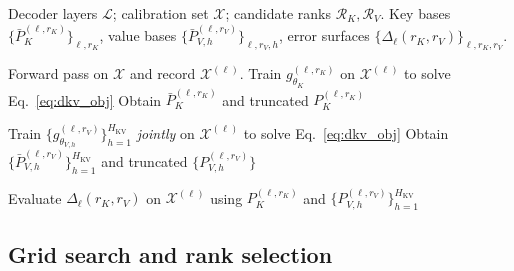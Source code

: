 \begin{algorithm}[t]
\caption{\methodname basis training and error-surface construction}
\label{alg:stiefattention}
\begin{algorithmic}[1]
{\renewcommand{\algorithmicrequire}{\textbf{Input:}}%
\REQUIRE Decoder layers $\mathcal{L}$; calibration set $\mathcal{X}$; candidate ranks $\mathcal{R}_K,\mathcal{R}_V$.}
{\renewcommand{\algorithmicensure}{\textbf{Output:}}%
\ENSURE Key bases $\{\bar P_K^{(\ell,r_K)}\}_{\ell,r_K}$, value bases $\{\bar P_{V,h}^{(\ell,r_V)}\}_{\ell,r_V,h}$, error surfaces $\{\Delta_\ell(r_K,r_V)\}_{\ell,r_K,r_V}$.}

\STATE Forward pass on $\mathcal{X}$ and record $\mathcal{X}^{(\ell)}$.
        \STATE Train $g_{\theta_K}^{(\ell,r_K)}$ on $\mathcal{X}^{(\ell)}$ to solve Eq.~\ref{eq:dkv_obj}
        \STATE Obtain $\bar P_K^{(\ell,r_K)}$ and truncated $P_K^{(\ell,r_K)}$
    \ENDFOR

        \STATE Train $\{g_{\theta_{V,h}}^{(\ell,r_V)}\}_{h=1}^{H_{\mathrm{KV}}}$ \emph{jointly} on $\mathcal{X}^{(\ell)}$ to solve Eq.~\ref{eq:dkv_obj}
        \STATE Obtain $\{\bar P_{V,h}^{(\ell,r_V)}\}_{h=1}^{H_{\mathrm{KV}}}$ and truncated $\{P_{V,h}^{(\ell,r_V)}\}$
    \ENDFOR

        \STATE Evaluate $\Delta_\ell(r_K,r_V)$ on $\mathcal{X}^{(\ell)}$ using $P_K^{(\ell,r_K)}$ and $\{P_{V,h}^{(\ell,r_V)}\}_{h=1}^{H_{\mathrm{KV}}}$
    \ENDFOR
\ENDFOR
\end{algorithmic}
\end{algorithm}
%
\subsection{Grid search and rank selection}
\label{sec:rank_selection}

